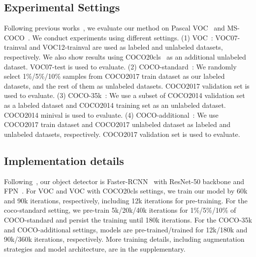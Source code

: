 \documentclass{bmvc2k}
\begin{document}
\subsection{Experimental Settings}
Following previous works~\cite{liu2021unbiased}, we evaluate our method on Pascal VOC~\cite{voc} and MS-COCO~\cite{mscoco}. We conduct experiments using different settings. (1) VOC~\cite{liu2021unbiased}: VOC07-trainval and VOC12-trainval are used as labeled and unlabeled datasets, respectively.
We also show results using COCO20cls~\cite{liu2021unbiased} as an additional unlabeled dataset. VOC07-test is used to evaluate. (2) COCO-standard~\cite{liu2021unbiased}: We randomly select 1\%/5\%/10\% samples from COCO2017 train dataset as our labeled datasets, and the rest of them as unlabeled datasets. COCO2017 validation set is used to evaluate. (3) COCO-35k~\cite{wang2021data}: We use a subset of COCO2014 validation set as a labeled dataset and COCO2014 training set as an unlabeled dataset. COCO2014 minival is used to evaluate. (4) COCO-additional~\cite{liu2021unbiased}: We use COCO2017 train dataset and COCO2017 unlabeled dataset as labeled and unlabeled datasets, respectively. COCO2017 validation set is used to evaluate.

\subsection{Implementation details}
Following~\cite{STAC, liu2021unbiased}, our object detector is Faster-RCNN~\cite{ren2015faster} with ResNet-50 backbone and FPN~\cite{fpn}. For VOC and VOC with COCO20cls settings, we train our model by 60k and 90k iterations, respectively, including 12k iterations for pre-training. For the coco-standard setting, we pre-train 5k/20k/40k iterations for 1\%/5\%/10\% of COCO-standard and persist the training until 180k iterations. For the COCO-35k and COCO-additional settings, models are pre-trained/trained for 12k/180k and 90k/360k iterations, respectively. More training details, including augmentation strategies and model architecture, are in the supplementary.
\end{document}
